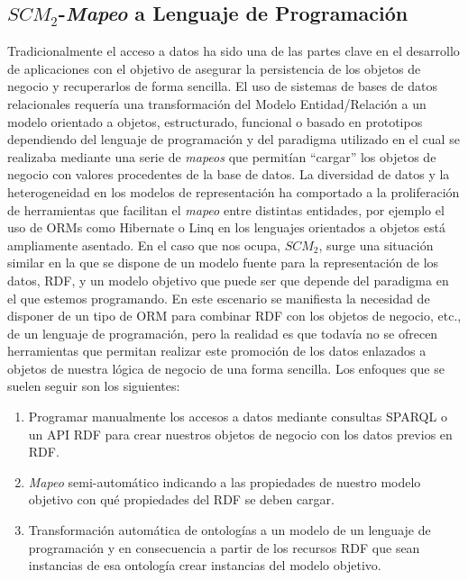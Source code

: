 \subsection{$SCM_2$-\textit{Mapeo} a Lenguaje de Programación}\label{scm2-consumo}
Tradicionalmente el acceso a datos ha sido una de las partes clave en el desarrollo de aplicaciones con el objetivo
de asegurar la persistencia de los objetos de negocio y recuperarlos de forma sencilla. El uso de sistemas de bases de datos relacionales
requería una transformación del Modelo Entidad/Relación a un modelo orientado a objetos, estructurado, funcional o basado
en prototipos dependiendo del lenguaje de programación y del paradigma utilizado en el cual se realizaba mediante
una serie de \textit{mapeos} que permitían ``cargar'' los objetos de negocio con valores procedentes de la base de datos.
La diversidad de datos y la heterogeneidad en los modelos de representación ha comportado a la proliferación 
de herramientas que facilitan el \textit{mapeo} entre distintas entidades, por ejemplo el uso de ORMs como Hibernate o Linq en los lenguajes
orientados a objetos está ampliamente asentado. En el caso que nos ocupa, $SCM_2$, surge una situación similar en la que
se dispone de un modelo fuente para la representación de los datos, RDF, y un modelo objetivo que puede ser
que depende del paradigma en el que estemos programando. En este escenario se manifiesta la necesidad
de disponer de un tipo de \gls{ORM} para combinar \gls{RDF} con los objetos de negocio, etc., de un lenguaje de programación, pero 
la realidad es que todavía no se ofrecen herramientas que permitan realizar este promoción de los datos enlazados
a objetos de nuestra lógica de negocio de una forma sencilla. Los enfoques que se suelen seguir son los siguientes:

\begin{enumerate}
 \item Programar manualmente los accesos a datos mediante consultas \gls{SPARQL} o un \gls{API} RDF para crear
nuestros objetos de negocio con los datos previos en RDF.
\item \textit{Mapeo} semi-automático indicando a las propiedades de nuestro modelo objetivo con qué propiedades
del \dataset RDF se deben cargar.
\item Transformación automática de ontologías a un modelo de un lenguaje de programación y en consecuencia
a partir de los recursos RDF que sean instancias de esa ontología crear instancias del modelo objetivo.
\end{enumerate}


